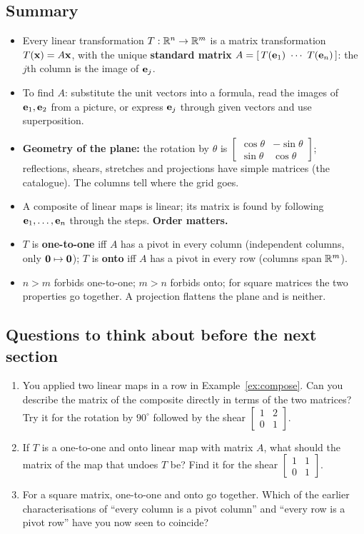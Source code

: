 \documentclass[11pt]{article}
\begin{document}
\subsection*{Summary}
\begin{itemize}
  \item Every linear transformation $T:\mathbb{R}^n\to\mathbb{R}^m$ is a matrix transformation $T(\mathbf{x})=A\mathbf{x}$, with the unique \textbf{standard matrix} $A=[\,T(\mathbf{e}_1)\ \cdots\ T(\mathbf{e}_n)\,]$: the $j$th column is the image of $\mathbf{e}_j$.
  \item To find $A$: substitute the unit vectors into a formula, read the images of $\mathbf{e}_1,\mathbf{e}_2$ from a picture, or express $\mathbf{e}_j$ through given vectors and use superposition.
  \item \textbf{Geometry of the plane:} the rotation by $\theta$ is $\begin{bmatrix}\cos\theta&-\sin\theta\\\sin\theta&\cos\theta\end{bmatrix}$; reflections, shears, stretches and projections have simple matrices (the catalogue). The columns tell where the grid goes.
  \item A composite of linear maps is linear; its matrix is found by following $\mathbf{e}_1,\dots,\mathbf{e}_n$ through the steps. \textbf{Order matters.}
  \item $T$ is \textbf{one-to-one} iff $A$ has a pivot in every column (independent columns, only $\mathbf{0}\mapsto\mathbf{0}$); $T$ is \textbf{onto} iff $A$ has a pivot in every row (columns span $\mathbb{R}^m$).
  \item $n>m$ forbids one-to-one; $m>n$ forbids onto; for square matrices the two properties go together. A projection flattens the plane and is neither.
\end{itemize}

\subsection*{Questions to think about before the next section}
\begin{enumerate}
  \item You applied two linear maps in a row in Example~\ref{ex:compose}. Can you describe the matrix of the composite directly in terms of the two matrices? Try it for the rotation by $90^\circ$ followed by the shear $\begin{bmatrix}1&2\\0&1\end{bmatrix}$.
  \item If $T$ is a one-to-one and onto linear map with matrix $A$, what should the matrix of the map that undoes $T$ be? Find it for the shear $\begin{bmatrix}1&1\\0&1\end{bmatrix}$.
  \item For a square matrix, one-to-one and onto go together. Which of the earlier characterisations of ``every column is a pivot column'' and ``every row is a pivot row'' have you now seen to coincide?
\end{enumerate}
\end{document}
